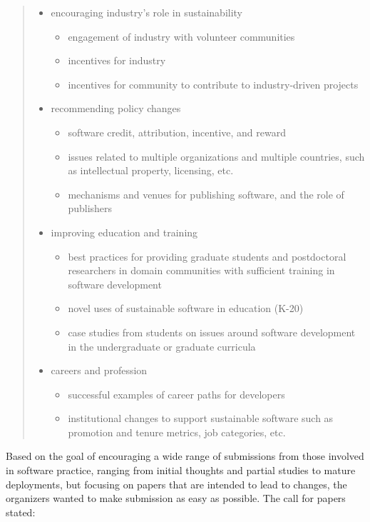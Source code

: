 \documentclass[11pt, oneside]{amsart}
\begin{document}
\begin{quote}
\begin{itemize}
\item encouraging industry's role in sustainability
\begin{itemize}
\item engagement of industry with volunteer communities
\item incentives for industry
\item incentives for community to contribute to industry-driven projects
\end{itemize}

\item recommending policy changes
\begin{itemize}
\item software credit, attribution, incentive, and reward
\item issues related to multiple organizations and multiple countries, such as
intellectual property, licensing, etc.
\item mechanisms and venues for publishing software, and the role of publishers
\end{itemize}

\item improving education and training
\begin{itemize}
\item best practices for providing graduate students and postdoctoral
researchers in domain communities with sufficient training in software
development
\item novel uses of sustainable software in education (K-20)
\item case studies from students on issues around software development in the
undergraduate or graduate curricula
\end{itemize}

\item careers and profession
\begin{itemize}
\item successful examples of career paths for developers
\item institutional changes to support sustainable software such as promotion
and tenure metrics, job categories, etc.
\end{itemize}

\end{itemize}

\end{quote}

Based on the goal of encouraging a wide range of submissions from those involved
in software practice, ranging from initial thoughts and partial studies to
mature deployments, but focusing on papers that are intended to lead to changes,
the organizers wanted to make submission as easy as possible. The call for
papers stated:
\end{document}
